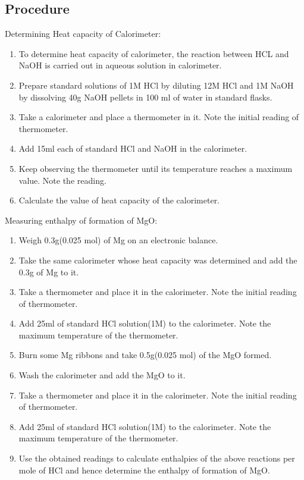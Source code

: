 \subsection{Procedure}
Determining Heat capacity of Calorimeter:
\begin{enumerate}
\item To determine heat capacity of calorimeter, the reaction between HCL and NaOH is carried out in aqueous solution in calorimeter.
\item Prepare standard solutions of 1M HCl by diluting 12M HCl and 1M NaOH by dissolving 40g NaOH pellets in 100 ml of  water in standard flasks.
\item Take a calorimeter and place a thermometer in it. Note the initial reading of thermometer.
\item Add 15ml each of standard HCl and NaOH in the calorimeter.
\item Keep observing the thermometer until its temperature reaches a maximum value. Note the reading.
\item Calculate the value of heat capacity of the calorimeter.
\end{enumerate}
\vspace{5mm}
Measuring enthalpy of formation of MgO:
\begin{enumerate}
\item Weigh 0.3g(0.025 mol) of Mg on an electronic balance.
\item Take the same calorimeter whose heat capacity was determined and add the 0.3g of Mg to it.
\item Take a thermometer and place it in the calorimeter. Note the initial reading of thermometer.
\item Add 25ml of standard HCl solution(1M) to the calorimeter. Note the maximum temperature of the thermometer.
\item Burn some Mg ribbons and take 0.5g(0.025 mol) of the MgO formed.
\item Wash the calorimeter and add the MgO to it. 
\item Take a thermometer and place it in the calorimeter. Note the initial reading of thermometer.
\item Add 25ml of standard HCl solution(1M) to the calorimeter. Note the maximum temperature of the thermometer.
\item Use the obtained readings to calculate enthalpies of the above reactions per mole of HCl and hence determine the enthalpy of formation of MgO.
\end{enumerate}

